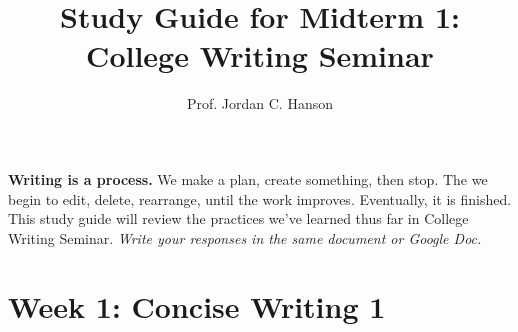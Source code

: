 \documentclass{article}
\begin{document}
\title{Study Guide for Midterm 1: College Writing Seminar}
\author{Prof. Jordan C. Hanson}

\maketitle

\textbf{Writing is a process.}  We make a plan, create something, then stop.  The we begin to edit, delete, rearrange, until the work improves.  Eventually, it is finished.  This study guide will review the practices we've learned thus far in College Writing Seminar.  \textit{Write your responses in the same document or Google Doc.}

\section{Week 1: Concise Writing 1}
\end{document}

